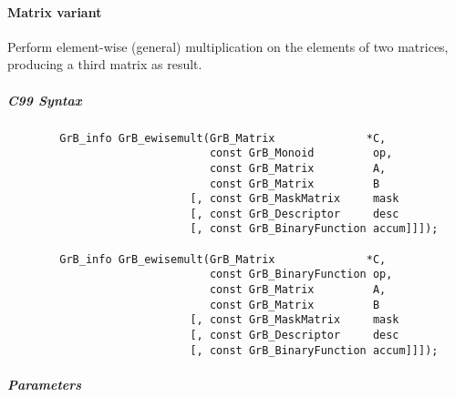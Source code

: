 \paragraph{Matrix variant}

Perform element-wise (general) multiplication on the elements of two matrices,
producing a third matrix as result.



\subparagraph{C99 Syntax}

\begin{verbatim}
        GrB_info GrB_ewisemult(GrB_Matrix              *C,
                               const GrB_Monoid         op, 
                               const GrB_Matrix         A,
                               const GrB_Matrix         B
                            [, const GrB_MaskMatrix     mask
                            [, const GrB_Descriptor     desc
                            [, const GrB_BinaryFunction accum]]]);
                            
        GrB_info GrB_ewisemult(GrB_Matrix              *C,
                               const GrB_BinaryFunction op, 
                               const GrB_Matrix         A,
                               const GrB_Matrix         B
                            [, const GrB_MaskMatrix     mask
                            [, const GrB_Descriptor     desc
                            [, const GrB_BinaryFunction accum]]]);
\end{verbatim}

\subparagraph{Parameters}

